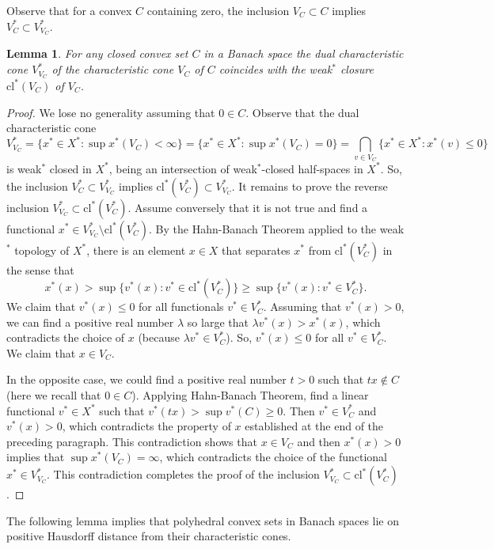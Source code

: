 \documentclass{amsart}
\newcommand{\cl}{\mathrm{cl}}
\newtheorem{lemma}[theorem]{Lemma}
\theoremstyle{definition}
\begin{document}
Observe that for a convex $C$ containing zero, the inclusion $V_C\subset C$ implies $V_C^*\subset V^*_{V_C}$.

\begin{lemma}\label{l2.5n} For any closed convex set $C$ in a Banach space the dual characteristic cone $V^*_{V_C}$ of the characteristic cone $V_C$ of $C$ coincides with the weak$^*$ closure $\cl^*(V_C)$ of $V_C$.
\end{lemma}

\begin{proof} We lose no generality assuming that $0\in C$. Observe that the dual characteristic cone $$V^*_{V_C}=\{x^*\in X^*:\sup x^*(V_C)<\infty\}=\{x^*\in X^*:\sup x^*(V_C)=0\}=\bigcap_{v\in V_C}\{x^*\in X^*:x^*(v)\le 0\}$$is weak$^*$ closed in $X^*$, being an intersection of weak$^*$-closed half-spaces in $X^*$. So, the inclusion $V^*_C\subset V^*_{V_C}$ implies $\cl^*(V^*_C)\subset V^*_{V_C}$. It remains to prove the reverse inclusion $V^*_{V_C}\subset \cl^*(V^*_C)$. Assume conversely that it is not true and find a functional $x^*\in V^*_{V_C}\setminus\cl^*(V^*_C)$. By the Hahn-Banach Theorem applied to the weak$^*$ topology of $X^*$, there is an element $x\in X$ that separates $x^*$ from $\cl^*(V^*_C)$ in the sense that $$x^*(x)>\sup\{v^*(x):v^*\in\cl^*(V^*_C)\}\ge\sup\{v^*(x):v^*\in V^*_C\}.$$ We claim that $v^*(x)\le 0$ for all functionals $v^*\in V^*_C$. Assuming that $v^*(x)>0$, we can find a positive real number $\lambda$ so large that $\lambda v^*(x)>x^*(x)$, which contradicts the choice of $x$ (because $\lambda v^*\in V^*_C$). So, $v^*(x)\le 0$ for all $v^*\in V^*_C$. We claim that $x\in V_C$.

In the opposite case, we could find a positive real number $t>0$ such that $tx\notin C$ (here we recall that $0\in C$). Applying Hahn-Banach Theorem, find a linear functional $v^*\in X^*$ such that  $v^*(tx)>\sup v^*(C)\ge 0$. Then $v^*\in V^*_C$ and $v^*(x)>0$, which contradicts the property of $x$ established at the end of the preceding paragraph. This contradiction shows that $x\in V_C$ and then $x^*(x)>0$ implies that $\sup x^*(V_C)=\infty$, which contradicts the choice of the functional $x^*\in V^*_{V_C}$. This contradiction completes the proof of the inclusion $V^*_{V_C}\subset \cl^*(V^*_C)$.
\end{proof}


The following lemma implies that polyhedral convex sets in Banach spaces lie on positive Hausdorff distance from their characteristic cones.
\end{document}
